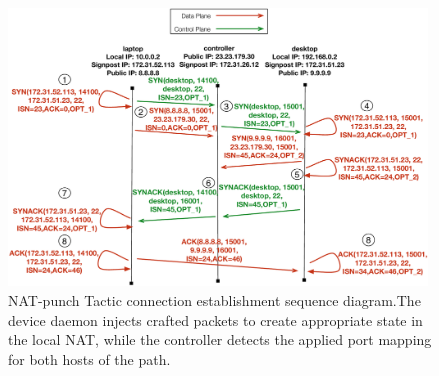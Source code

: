 \begin{itemize}
\begin{figure}
  \begin{center}
	\includegraphics[width=0.99\textwidth]{nat-punch-example}
  \end{center}
  \caption[NAT-punch Tactic connection establishment sequence
  diagram.]{NAT-punch Tactic connection establishment sequence diagram.The
    device \signpost daemon injects crafted packets to create appropriate state
    in the local NAT, while the controller detects the applied port mapping for
    both hosts of the \signpost path.}
  \label{fig:signpost:nat-panch-example}
\end{figure}
  

\end{itemize}
